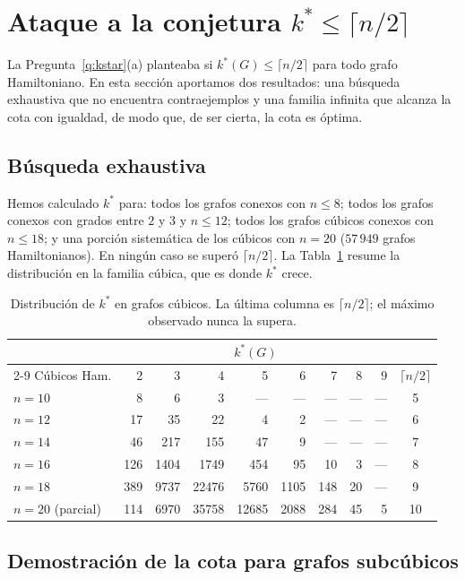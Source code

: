 \documentclass[11pt,a4paper]{article}
\theoremstyle{definition}
\theoremstyle{remark}
\begin{document}
\section{Ataque a la conjetura $k^*\le\lceil n/2\rceil$}\label{sec:ataque}

La Pregunta~\ref{q:kstar}(a) planteaba si $k^*(G)\le\lceil n/2\rceil$ para todo grafo Hamiltoniano. En esta sección aportamos dos resultados: una búsqueda exhaustiva que no encuentra contraejemplos y una familia infinita que alcanza la cota con igualdad, de modo que, de ser cierta, la cota es óptima.

\subsection{Búsqueda exhaustiva}

Hemos calculado $k^*$ para: todos los grafos conexos con $n\le8$; todos los grafos conexos con grados entre $2$ y $3$ y $n\le12$; todos los grafos cúbicos conexos con $n\le18$; y una porción sistemática de los cúbicos con $n=20$ ($57\,949$ grafos Hamiltonianos). En ningún caso se superó $\lceil n/2\rceil$. La Tabla~\ref{tab:cubicos} resume la distribución en la familia cúbica, que es donde $k^*$ crece.

\begin{table}[h]
\centering
\small
\begin{tabular}{lrrrrrrrrc}
\toprule
& \multicolumn{8}{c}{$k^*(G)$} & \\
\cmidrule(lr){2-9}
Cúbicos Ham. & 2 & 3 & 4 & 5 & 6 & 7 & 8 & 9 & $\lceil n/2\rceil$\\
\midrule
$n=10$ & 8 & 6 & 3 & --- & --- & --- & --- & --- & 5\\
$n=12$ & 17 & 35 & 22 & 4 & 2 & --- & --- & --- & 6\\
$n=14$ & 46 & 217 & 155 & 47 & 9 & --- & --- & --- & 7\\
$n=16$ & 126 & 1404 & 1749 & 454 & 95 & 10 & 3 & --- & 8\\
$n=18$ & 389 & 9737 & 22476 & 5760 & 1105 & 148 & 20 & --- & 9\\
$n=20$ (parcial) & 114 & 6970 & 35758 & 12685 & 2088 & 284 & 45 & 5 & 10\\
\bottomrule
\end{tabular}
\caption{Distribución de $k^*$ en grafos cúbicos. La última columna es $\lceil n/2\rceil$; el máximo observado nunca la supera.}\label{tab:cubicos}
\end{table}


\subsection{Demostración de la cota para grafos subcúbicos}\label{sub:subcubico}
\end{document}
